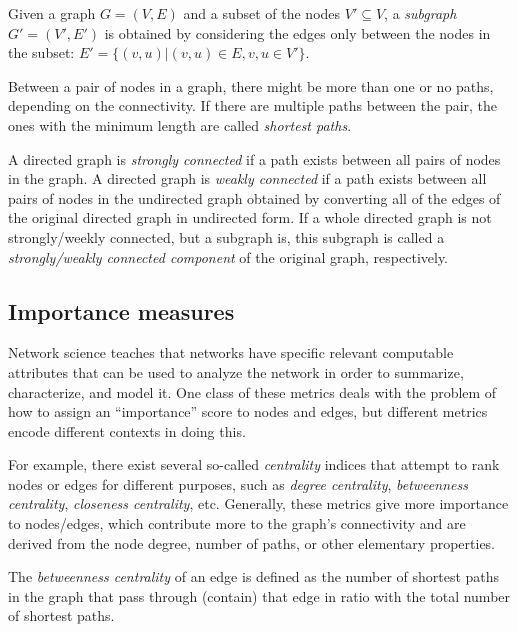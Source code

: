 \begin{definition}
Given a graph $G=(V, E)$ and a subset of the nodes $V' \subseteq V$, a \emph{subgraph} $G'=(V', E')$ is obtained by considering the edges only between the nodes in the subset: $E' = \{(v, u)|(v, u) \in E, v,u \in V'\}$.
\end{definition}

\begin{definition}
Between a pair of nodes in a graph, there might be more than one or no paths, depending on the connectivity. If there are multiple paths between the pair, the ones with the minimum length are called \emph{shortest paths}.
\end{definition}

\begin{definition}
A directed graph is \emph{strongly connected} if a path exists between all pairs of nodes in the graph. A directed graph is \emph{weakly connected} if a path exists between all pairs of nodes in the undirected graph obtained by converting all of the edges of the original directed graph in undirected form. If a whole directed graph is not strongly/weekly connected, but a subgraph is, this subgraph is called a \emph{strongly/weakly connected component} of the original graph, respectively.
\end{definition}

\subsection{Importance measures}

Network science teaches that networks have specific relevant computable attributes that can be used to analyze the network in order to summarize, characterize, and model it. One class of these metrics deals with the problem of how to assign an \enquote{importance} score to nodes and edges, but different metrics encode different contexts in doing this.

For example, there exist several so-called \emph{centrality} indices that attempt to rank nodes or edges for different purposes, such as \emph{degree centrality}, \emph{betweenness centrality}, \emph{closeness centrality}, etc. Generally, these metrics give more importance to nodes/edges, which contribute more to the graph's connectivity and are derived from the node degree, number of paths, or other elementary properties.

\begin{definition}
The \emph{betweenness centrality} of an edge is defined as the number of shortest paths in the graph that pass through (contain) that edge in ratio with the total number of shortest paths.
\end{definition}

